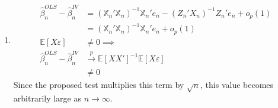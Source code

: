 \documentclass[11pt]{article}
\newcommand{\E}{\mathbb{E}}
\newcommand{\X}{\mathbb{X}}
\begin{document}
\begin{enumerate}[label=\alph*)]
\item 
\begin{align*}
\hat{\beta}^{OLS}_n - \hat{\beta}^{IV}_n &= (\X_n'\X_n)^{-1}\X_n'e_n - (Z_n' X_n)^{-1} Z_n' e_n + o_p(1)\\
&= (\X_n' \X_n)^{-1}\X_n' e_n + o_p(1)\\
\E[X\varepsilon] &\ne 0 \implies\\
\hat{\beta}_n^{OLS} - \hat{\beta}_n^{IV} &\overset{p}{\to} \E[XX']^{-1}\E[X\varepsilon]\\
&\ne 0
\end{align*}
Since the proposed test multiplies this term by $\sqrt{n}$, this value becomes arbitrarily large as $n \to \infty$.
  \end{enumerate}
\end{document}
